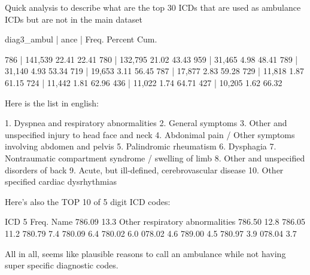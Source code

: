 \documentclass{article}
\begin{document}
Quick analysis to describe what are the top 30 ICDs that are used as ambulance ICDs but are not in the main dataset
  \begin{markdown}

  diag3_ambul |
         ance |      Freq.     Percent        Cum.

          786 |    141,539       22.41       22.41
          780 |    132,795       21.02       43.43
          959 |     31,465        4.98       48.41
          789 |     31,140        4.93       53.34
          719 |     19,653        3.11       56.45
          787 |     17,877        2.83       59.28
          729 |     11,818        1.87       61.15
          724 |     11,442        1.81       62.96
          436 |     11,022        1.74       64.71
          427 |     10,205        1.62       66.32

\end{markdown}
\begin{markdown}

Here is the list in english:

    1. Dyspnea and respiratory abnormalities
    2. General symptoms
    3. Other and unspecified injury to head face and neck
    4. Abdonimal pain / Other symptoms involving abdomen and pelvis
    5. Palindromic rheumatism 
    6. Dysphagia
    7. Nontraumatic compartment syndrome / swelling of limb
    8. Other and unspecified disorders of back
    9. Acute, but ill-defined, cerebrovascular disease
    10. Other specified cardiac dysrhythmias


Here's also the TOP 10 of 5 digit ICD codes:

    ICD 5   Freq. Name
    786.09  13.3  Other respiratory abnormalities
    786.50  12.8%
    786.05  11.2%
    780.79  7.4%
    780.09  6.4%
    780.02  6.0%
    078.02  4.6%
    789.00  4.5%
    780.97  3.9%
    078.04  3.7%

All in all, seems like plausible reasons to call an ambulance while not having super specific diagnostic codes.
\end{markdown}
\end{document}
